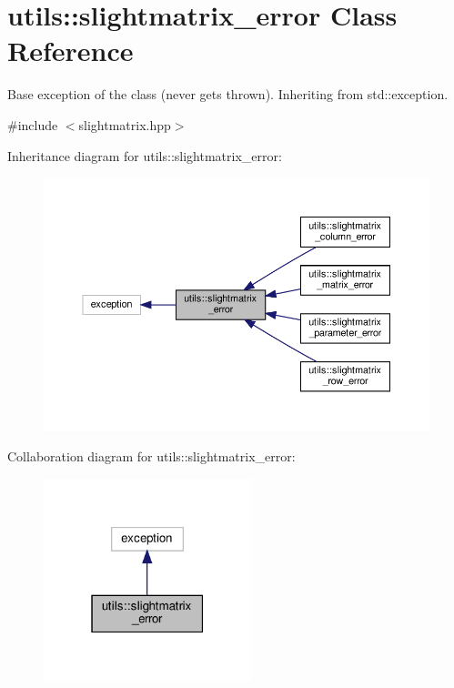 \hypertarget{classutils_1_1slightmatrix__error}{}\section{utils\+:\+:slightmatrix\+\_\+error Class Reference}
\label{classutils_1_1slightmatrix__error}


Base exception of the class (never gets thrown). Inheriting from std\+::exception.  




{\ttfamily \#include $<$slightmatrix.\+hpp$>$}



Inheritance diagram for utils\+:\+:slightmatrix\+\_\+error\+:\nopagebreak
\begin{figure}[H]
\begin{center}
\leavevmode
\includegraphics[width=350pt]{classutils_1_1slightmatrix__error__inherit__graph}
\end{center}
\end{figure}


Collaboration diagram for utils\+:\+:slightmatrix\+\_\+error\+:\nopagebreak
\begin{figure}[H]
\begin{center}
\leavevmode
\includegraphics[width=171pt]{classutils_1_1slightmatrix__error__coll__graph}
\end{center}
\end{figure}


